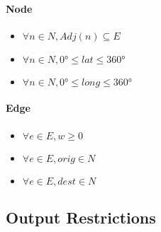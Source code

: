 \paragraph{Node}
\begin{itemize}
    \item $ \forall n \in N, Adj(n) \subseteq E $
    \item $ \forall n \in N, \ang{0} \leq lat \leq \ang{360} $
    \item $ \forall n \in N, \ang{0} \leq long \leq \ang{360} $
\end{itemize}
\paragraph{Edge}
\begin{itemize}
    \item $ \forall e \in E, w \geq 0 $
    \item $ \forall e \in E, orig \in N $
    \item $ \forall e \in E, dest \in N $
\end{itemize}



\subsection{Output Restrictions}


